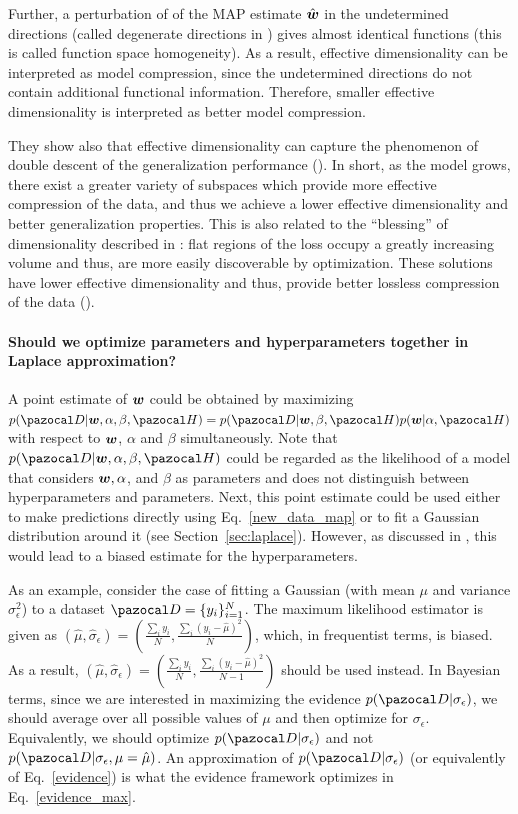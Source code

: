Further, a perturbation of of the MAP estimate $\hat{\boldsymbol{w}}$ in the undetermined directions (called degenerate directions in \cite{maddox2020rethinking}) gives almost identical functions (this is called function space homogeneity).
As a result, effective dimensionality can be interpreted as model compression, since the undetermined directions do not contain additional functional information. 
Therefore, smaller effective dimensionality is interpreted as better model compression.

They show also that effective dimensionality can capture the phenomenon of double descent of the generalization performance (\cite{nakkiran2019deep}).
In short, as the model grows, there exist a greater variety of subspaces which provide more effective compression of the data, and thus we achieve a lower effective dimensionality and better generalization properties. 
This is also related to the ``blessing'' of dimensionality described in \textcite{huang2019understanding}: flat regions of the loss occupy a greatly increasing volume and thus, are more easily discoverable by optimization. 
These solutions have lower effective dimensionality and thus, provide better lossless compression of the data (\cite{maddox2020rethinking}). 

\paragraph{Should we optimize parameters and hyperparameters together in Laplace approximation?}
A point estimate of $\boldsymbol{w}$ could be obtained by maximizing $p(\cD|\bw, \alpha,\beta,\cH) = p(\cD|\bw,\beta,\cH) p(\bw|\alpha,\cH)$ with respect to $\boldsymbol{w}$, $\alpha$ and $\beta$ simultaneously. 
Note that $p(\cD|\bw, \alpha,\beta,\cH)$ could be regarded as the likelihood of a model that considers $\boldsymbol{w}, \alpha$, and $\beta$ as parameters and does not distinguish between hyperparameters and parameters.
Next, this point estimate could be used either to make predictions directly using Eq.~\eqref{new_data_map} or to fit a Gaussian distribution around it (see Section~\ref{sec:laplace}). 
However, as discussed in \textcite{mackay1995developments}, this would lead to a biased estimate for the hyperparameters. 

As an example, consider the case of fitting a Gaussian (with mean $\mu$ and variance $\sigma_{\epsilon}^2$) to a dataset $\cD=\{y_i\}_{i=1}^N$. 
The maximum likelihood estimator is given as $(\hat{\mu},\hat{\sigma}_{\epsilon})=(\frac{\sum_i y_i}{N}, \frac{\sum_i (y_i-\hat{\mu})^2}{N})$, which, in frequentist terms, is biased. 
As a result, $(\hat{\mu},\hat{\sigma}_{\epsilon})=(\frac{\sum_i y_i}{N}, \frac{\sum_i (y_i-\hat{\mu})^2}{N-1})$ should be used instead.
In Bayesian terms, since we are interested in maximizing the evidence $p(\cD|\sigma_{\epsilon})$, we should average over all possible values of $\mu$ and then optimize for $\sigma_{\epsilon}$. 
Equivalently, we should optimize $p(\cD|\sigma_{\epsilon})$ and not $p(\cD|\sigma_{\epsilon}, \mu=\hat{\mu})$.
An approximation of $p(\cD|\sigma_{\epsilon})$ (or equivalently of Eq.~\eqref{evidence}) is what the evidence framework optimizes in Eq.~\eqref{evidence_max}.

